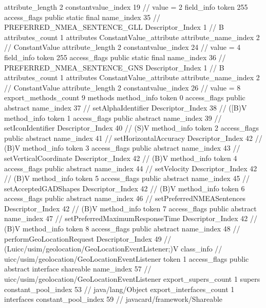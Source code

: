 {{{{{{{					attribute_length	2
					constantvalue_index	19		// value = 2
				}
				}
			}
			field_info {
				token	255
				access_flags	public static final
				name_index	35		// PREFERRED_NMEA_SENTENCE_GLL
				Descriptor_Index	1		// B
				attributes_count	1
				attributes {
				ConstantValue_attribute {
					attribute_name_index	2		// ConstantValue
					attribute_length	2
					constantvalue_index	24		// value = 4
				}
				}
			}
			field_info {
				token	255
				access_flags	public static final
				name_index	36		// PREFERRED_NMEA_SENTENCE_GNS
				Descriptor_Index	1		// B
				attributes_count	1
				attributes {
				ConstantValue_attribute {
					attribute_name_index	2		// ConstantValue
					attribute_length	2
					constantvalue_index	26		// value = 8
				}
				}
			}
			}
			export_methods_count	9
			methods {
				method_info {
					token	0
					access_flags	public abstract
					name_index	37		// setAlphaIdentifier
					Descriptor_Index	38		// ([B)V
				}
				method_info {
					token	1
					access_flags	public abstract
					name_index	39		// setIconIdentifier
					Descriptor_Index	40		// (S)V
				}
				method_info {
					token	2
					access_flags	public abstract
					name_index	41		// setHorizontalAccuracy
					Descriptor_Index	42		// (B)V
				}
				method_info {
					token	3
					access_flags	public abstract
					name_index	43		// setVerticalCoordinate
					Descriptor_Index	42		// (B)V
				}
				method_info {
					token	4
					access_flags	public abstract
					name_index	44		// setVelocity
					Descriptor_Index	42		// (B)V
				}
				method_info {
					token	5
					access_flags	public abstract
					name_index	45		// setAcceptedGADShapes
					Descriptor_Index	42		// (B)V
				}
				method_info {
					token	6
					access_flags	public abstract
					name_index	46		// setPreferredNMEASentences
					Descriptor_Index	42		// (B)V
				}
				method_info {
					token	7
					access_flags	public abstract
					name_index	47		// setPreferredMaximumResponseTime
					Descriptor_Index	42		// (B)V
				}
				method_info {
					token	8
					access_flags	public abstract
					name_index	48		// performGeoLocationRequest
					Descriptor_Index	49		// (Luicc/usim/geolocation/GeoLocationEventListener;)V
				}
			}
		}
		class_info {		// uicc/usim/geolocation/GeoLocationEventListener
			token	1
			access_flags	public abstract interface shareable
			name_index	57		// uicc/usim/geolocation/GeoLocationEventListener
			export_supers_count	1
			supers {
				constant_pool_index	53		// java/lang/Object
			}
			export_interfaces_count	1
			interfaces {
				constant_pool_index	59		// javacard/framework/Shareable
}}}}
